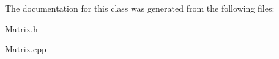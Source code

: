 The documentation for this class was generated from the following files\+:\begin{DoxyCompactItemize}
\item 
Matrix.\+h\item 
Matrix.\+cpp\end{DoxyCompactItemize}
